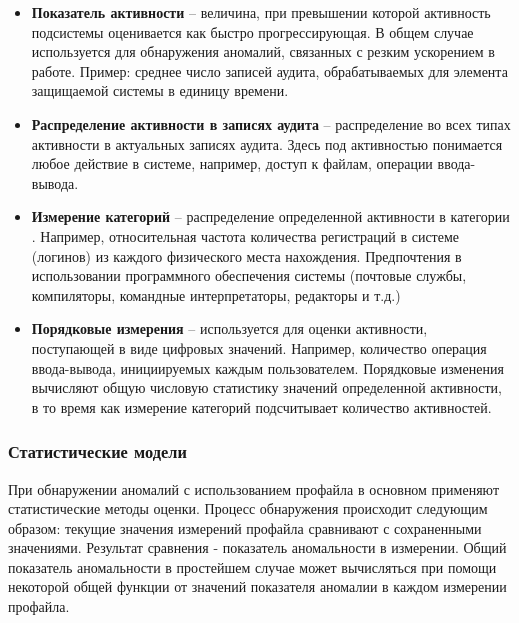 \begin{itemize}
	\item \textbf{Показатель активности} -- величина, при превышении которой активность
	подсистемы оценивается как быстро прогрессирующая. В общем случае используется для
	обнаружения аномалий, связанных с резким ускорением в работе. Пример: среднее число
	записей аудита, обрабатываемых для элемента защищаемой системы в единицу времени.

	\item \textbf{Распределение активности в записях аудита} -- распределение во всех типах
	активности в актуальных записях аудита. Здесь под активностью понимается любое действие
	в системе, например, доступ к файлам, операции ввода-вывода.

	\item \textbf{Измерение категорий} -- распределение определенной активности в
	категории \footnotemark. Например, относительная частота количества регистраций в
	системе (логинов) из каждого физического места нахождения. Предпочтения в использовании
	программного обеспечения системы (почтовые службы, компиляторы, командные интерпретаторы,
	редакторы и т.д.)

	\item \textbf{Порядковые измерения} -- используется для оценки активности, поступающей
	в виде цифровых значений. Например, количество операция ввода-вывода, инициируемых каждым
	пользователем. Порядковые изменения вычисляют общую числовую статистику значений определенной
	активности, в то время как измерение категорий подсчитывает количество активностей.
\end{itemize}
\autocite{BeynonDavies}



\subsubsection{Статистические модели}

При обнаружении аномалий с использованием профайла в основном применяют статистические
методы оценки. Процесс обнаружения происходит следующим образом: текущие значения измерений
профайла сравнивают с сохраненными значениями. Результат сравнения - показатель аномальности
в измерении. Общий показатель аномальности в простейшем случае может вычисляться при помощи
некоторой общей функции от значений показателя аномалии в каждом измерении профайла.

